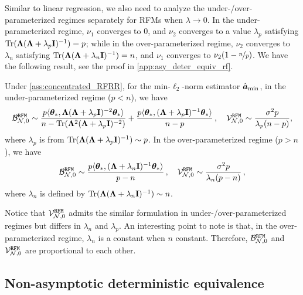 Similar to linear regression, we also need to analyze the under-/over-parameterized regimes separately for RFMs when $\lambda \rightarrow 0$.
In the under-parameterized regime, $\nu_1$ converges to $0$, and $\nu_2$ converges to a value $\lambda_p$ satisfying ${\rm Tr}({\boldsymbol \Lambda}({\boldsymbol \Lambda} + \lambda_p{\mathbf I})^{-1}) = p$; while in the over-parameterized regime, $\nu_2$ converges to $\lambda_n$ satisfying ${\rm Tr}({\boldsymbol \Lambda}({\boldsymbol \Lambda} + \lambda_n{\mathbf I})^{-1}) = n$, and $\nu_1$ converges to $\nu_2(1-\nicefrac{n}{p})$. 
We have the following result, see the proof in \cref{app:asy_deter_equiv_rf}. 


\begin{corollary}\label{prop:asy_equiv_norm_RFRR_minnorm}
    Under \cref{ass:concentrated_RFRR}, for the min-$\ell_2$-norm estimator $\hat{{\boldsymbol a}}_{\min}$, in the under-parameterized regime ($p<n$), we have
    \[
    \begin{aligned}
        \mathcal{B}^{\tt RFM}_{\mathcal{N},0} \sim \frac{p\langle{\boldsymbol \theta}_*, {\boldsymbol \Lambda} ({\boldsymbol \Lambda} +\lambda_p{\mathbf I})^{-2} {\boldsymbol \theta}_*\rangle}{n-{\rm Tr}({\boldsymbol \Lambda}^2({\boldsymbol \Lambda} +\lambda_p{\mathbf I})^{-2})} + \frac{p\langle{\boldsymbol \theta}_*, ({\boldsymbol \Lambda} +\lambda_p{\mathbf I})^{-1} {\boldsymbol \theta}_*\rangle}{n-p}\,, \quad 
        \mathcal{V}^{\tt RFM}_{\mathcal{N},0} \sim \frac{\sigma^2p}{\lambda_p(n-p)},
    \end{aligned}
    \]
    where $\lambda_p$ is from ${\rm Tr}({\boldsymbol \Lambda}({\boldsymbol \Lambda}+\lambda_p{\mathbf I})^{-1}) \sim p$. In the over-parameterized regime ($p>n$), we have
    \[
    \begin{aligned}
        \mathcal{B}^{\tt RFM}_{\mathcal{N},0} \sim \frac{p\langle{\boldsymbol \theta}_*, ( {\boldsymbol \Lambda} + \lambda_n{\mathbf I})^{-1} {\boldsymbol \theta}_*\rangle}{p-n}\,,
        \quad
        \mathcal{V}^{\tt RFM}_{\mathcal{N},0} \sim \frac{\sigma^2p}{\lambda_n(p-n)}\,,
    \end{aligned}
    \]
    where $\lambda_n$ is defined by ${\rm Tr}({\boldsymbol \Lambda}({\boldsymbol \Lambda}+\lambda_n{\mathbf I})^{-1}) \sim n$.
\end{corollary}
 Notice that $\mathcal{V}^{\tt RFM}_{\mathcal{N},0}$ admits the similar formulation in under-/over-parameterized regimes but differs in $\lambda_n$ and $\lambda_p$. An interesting point to note is that, in the over-parameterized regime, $\lambda_n$ is a constant when $n$ constant. Therefore, $\mathcal{B}^{\tt RFM}_{\mathcal{N},0}$ and $\mathcal{V}^{\tt RFM}_{\mathcal{N},0}$ are proportional to each other.

\vspace{-0.cm}
\subsection{Non-asymptotic deterministic equivalence}
\label{sec:linear_nonasym_rf}
\vspace{-0.cm}

